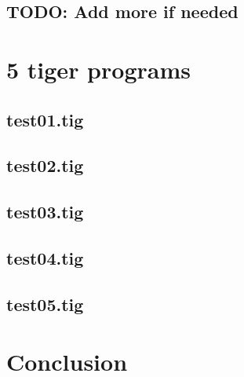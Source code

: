\documentclass{article}
\begin{document}
\subsection{TODO: Add more if needed}

\section{5 tiger programs}

\subsection{test01.tig}



\subsection{test02.tig}



\subsection{test03.tig}



\subsection{test04.tig}



\subsection{test05.tig}



\section{Conclusion}
\end{document}
